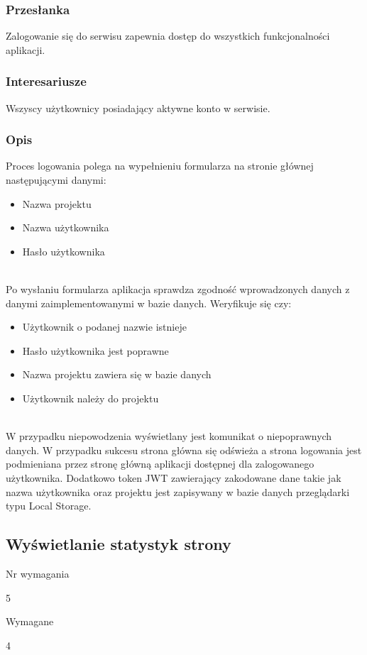 \documentclass[eng,printmode]{mgr}
\begin{document}
\subsubsection{Przesłanka}
Zalogowanie się do serwisu zapewnia dostęp do wszystkich funkcjonalności aplikacji.

\subsubsection{Interesariusze}
Wszyscy użytkownicy posiadający aktywne konto w serwisie.

\subsubsection{Opis}
Proces logowania polega na wypełnieniu formularza na stronie głównej następującymi danymi:
\begin{itemize}
	\item[--] Nazwa projektu
	\item[--] Nazwa użytkownika
	\item[--] Hasło użytkownika
\end{itemize}
\ \\
Po wysłaniu formularza aplikacja sprawdza zgodność wprowadzonych danych z danymi zaimplementowanymi w bazie danych. Weryfikuje się czy:
\begin{itemize}
	\item[--] Użytkownik o podanej nazwie istnieje
	\item[--] Hasło użytkownika jest poprawne
	\item[--] Nazwa projektu zawiera się w bazie danych
	\item[--] Użytkownik należy do projektu
\end{itemize}
\ \\
W przypadku niepowodzenia wyświetlany jest komunikat o niepoprawnych danych. W przypadku sukcesu strona główna się odświeża a strona logowania jest podmieniana przez stronę główną aplikacji dostępnej dla zalogowanego użytkownika. Dodatkowo token JWT zawierający zakodowane dane takie jak nazwa użytkownika oraz projektu jest zapisywany w bazie danych przeglądarki typu Local Storage\cite {Keyword_LocaLStorage}.
\newpage

\subsection{Wyświetlanie statystyk strony}
\begin{labeling}{Nr wymagania}
\item [Nr wymagania:] 5
\item [Priorytet:] Wymagane
\item [Powiązania:] 4
\end{labeling}
\end{document}
